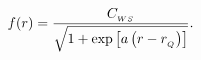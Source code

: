 \begin{equation}
f(r)=\frac{C_{_{WS}}}{\sqrt{1+\exp \left[ a\left( r-r_{_{{\tiny
Q}}}\right) \right] }}.  \label{WS}
\end{equation}

